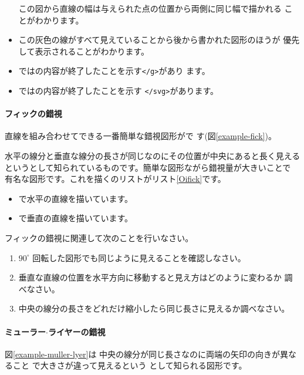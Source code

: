 \begin{itemize}
       この図から直線の幅は与えられた点の位置から両側に同じ幅で描かれる
       ことがわかります。
 \item この灰色の線がすべて見えていることから後から書かれた図形のほうが
       優先して表示されることがわかります。
 \item {}ではの内容が終了したことを示す\texttt{</g>}があり
       ます。
 \item {}ではの内容が終了したことを示す
       \texttt{</svg>}があります。
\end{itemize}
\paragraph{フィックの錯視}
直線を組み合わせてできる一番簡単な錯視図形がで
す(図\ref{example-fick})。

水平の線分と垂直な線分の長さが同じなのにその位置が中央にあると長く見える
 というとして知られているものです。簡単な図形ながら錯視量が大きいことで
 有名な図形です。これを描く\SVG のリストがリスト\ref{Oifick}です。
{}
\begin{itemize}
 \item {}で水平の直線を描いています。
 \item  {}で垂直の直線を描いています。
\end{itemize}
\begin{Problem}\upshape
フィックの錯視に関連して次のことを行いなさい。
\begin{enumerate}
 \item $90^{\circ}$ 回転した図形でも同じように見えることを確認しなさい。
 \item 垂直な直線の位置を水平方向に移動すると見え方はどのように変わるか
       調べなさい。
 \item 中央の線分の長さをどれだけ縮小したら同じ長さに見えるか調べなさい。 
\end{enumerate}
\end{Problem}

\paragraph{ミューラー$\cdot$ライヤーの錯視}
図\ref{example-muller-lyer}は
中央の線分が同じ長さなのに両端の矢印の向きが異なること
で大きさが違って見えるという
として知られる図形です。

